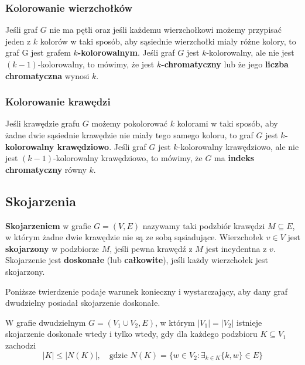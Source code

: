 \subsubsection*{Kolorowanie wierzchołków}

Jeśli graf $G$ nie ma pętli oraz jeśli każdemu wierzchołkowi możemy przypisać jeden z $k$ kolorów w taki sposób, aby sąsiednie wierzchołki miały różne kolory, to graf G jest grafem \textbf{$k$-kolorowalnym}. Jeśli graf $G$ jest $k$-kolorowalny, ale nie jest $(k-1)$-kolorowalny, to mówimy, że jest \textbf{$k$-chromatyczny} lub że jego \textbf{liczba chromatyczna} wynosi $k$.  

\subsubsection*{Kolorowanie krawędzi}

Jeśli krawędzie grafu $G$ możemy pokolorować $k$ kolorami w taki sposób, aby żadne dwie sąsiednie krawędzie nie miały tego samego koloru, to graf $G$ jest \textbf{$k$-kolorowalny krawędziowo}. Jeśli graf $G$ jest $k$-kolorowalny krawędziowo, ale nie jest $(k-1)$-kolorowalny krawędziowo, to mówimy, że $G$ ma \textbf{indeks chromatyczny} równy $k$.


\subsection*{Skojarzenia}

\textbf{Skojarzeniem} w grafie $G=(V,E)$ nazywamy taki podzbiór krawędzi $M \subseteq E$, w którym żadne dwie krawędzie nie są ze sobą sąsiadujące. Wierzchołek $v \in V$ jest \textbf{skojarzony} w podzbiorze $M$, jeśli pewna krawędź z $M$ jest incydentna z $v$. Skojarzenie jest \textbf{doskonałe} (lub \textbf{całkowite}), jeśli każdy wierzchołek jest skojarzony.

Poniższe twierdzenie podaje warunek konieczny i wystarczający, aby dany graf dwudzielny posiadał skojarzenie doskonałe.

\begin{theorem}[Hall, 1935]\label{theorem:hall}
W grafie dwudzielnym $G=(V_1 \cup V_2, E)$, w którym $|V_1|=|V_2|$ istnieje skojarzenie doskonałe wtedy i tylko wtedy, gdy dla każdego podzbioru $K \subseteq V_1$ zachodzi 
\[|K| \leq |N(K)|,\quad \text{gdzie } N(K)=\{ w \in V_2: \exists_{k \in K} \{k,w\} \in E \}\]
\end{theorem}
